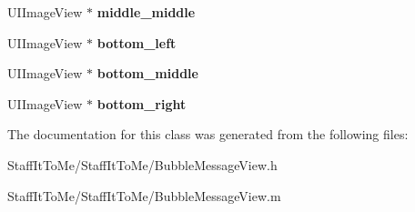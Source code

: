 \begin{DoxyCompactItemize}
\item 
\hypertarget{interface_bubble_message_view_a3dd9cb5b91f6028d1531cf18efb97bd0}{
\-U\-I\-Image\-View $\ast$ {\bfseries middle\-\_\-middle}}
\label{interface_bubble_message_view_a3dd9cb5b91f6028d1531cf18efb97bd0}

\item 
\hypertarget{interface_bubble_message_view_aeed0d637046065a70ba7c84c899ac7fd}{
\-U\-I\-Image\-View $\ast$ {\bfseries bottom\-\_\-left}}
\label{interface_bubble_message_view_aeed0d637046065a70ba7c84c899ac7fd}

\item 
\hypertarget{interface_bubble_message_view_a0be9e9deef4647d460d820431f2cf599}{
\-U\-I\-Image\-View $\ast$ {\bfseries bottom\-\_\-middle}}
\label{interface_bubble_message_view_a0be9e9deef4647d460d820431f2cf599}

\item 
\hypertarget{interface_bubble_message_view_a8f511eb9c8557916def392ec775e90f0}{
\-U\-I\-Image\-View $\ast$ {\bfseries bottom\-\_\-right}}
\label{interface_bubble_message_view_a8f511eb9c8557916def392ec775e90f0}

\end{DoxyCompactItemize}


\-The documentation for this class was generated from the following files\-:\begin{DoxyCompactItemize}
\item 
\-Staff\-It\-To\-Me/\-Staff\-It\-To\-Me/\-Bubble\-Message\-View.\-h\item 
\-Staff\-It\-To\-Me/\-Staff\-It\-To\-Me/\-Bubble\-Message\-View.\-m\end{DoxyCompactItemize}
